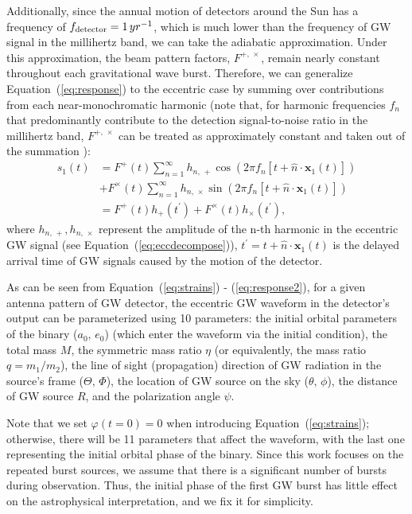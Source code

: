 \documentclass[%
 reprint,
 amsmath,amssymb,
 aps,
]{revtex4-2}
\begin{document}
Additionally, since the annual motion of detectors around the Sun has a frequency of $f_{\rm detector}=1\, yr^{-1}$, which is much lower than the frequency of GW signal in the millihertz band, we can take the adiabatic approximation. Under this approximation, the beam pattern factors, $F^{+,\, \times}$, remain nearly constant throughout each gravitational wave burst. Therefore, we can generalize Equation~(\ref{eq:response}) to the eccentric case by summing over contributions from each near-monochromatic harmonic (note that, for harmonic frequencies $f_n$ that predominantly contribute to the detection signal-to-noise ratio in the millihertz band, $F^{+,\, \times}$ can be treated as approximately constant and taken out of the summation \citep[see e.g.,][]{O'Leary+09,Wang+21,Xuan+23b}):
\begin{equation}
\begin{aligned}
s_1(t) & =F^{+}(t) \sum_{n=1}^{\infty}h_{n,\,+} \cos \left(2 \pi f_n\left[t+\hat{n} \cdot \mathbf{x}_1(t)\right]\right) \\
& +F^{\times}(t) \sum_{n=1}^{\infty}h_{n,\,\times} \sin \left(2 \pi f_n\left[t+\hat{n} \cdot \mathbf{x}_1(t)\right]\right) \\
& = F^{+}(t) h_{+}(t^{\prime}) +F^{\times}(t) h_{\times}(t^{\prime}) ,\label{eq:response2}
\end{aligned}
\end{equation}
where $h_{n,\,+}, h_{n,\,\times}$ represent the amplitude of the n-th harmonic in the eccentric GW signal (see Equation~(\ref{eq:eccdecompose})), $t^{\prime}=t+\hat{n} \cdot \mathbf{x}_1(t)$ is the delayed arrival time of GW signals caused by the motion of the detector.

As can be seen from Equation~(\ref{eq:strains}) - (\ref{eq:response2}), for a given antenna pattern of GW detector, the eccentric GW waveform in the detector's output can be parameterized using 10 parameters: the initial orbital parameters of the binary ($a_0,\,e_0$) (which enter the waveform via the initial condition), the total mass $M$, the symmetric mass ratio $\eta$ (or equivalently, the mass ratio $q=m_1/m_2$), the line of sight (propagation) direction of GW radiation in the source's frame ($\Theta,\, \Phi$), the location of GW source on the sky ($\theta,\, \phi$), the distance of GW source $R$, and the polarization angle $\psi$. 

Note that we set $\varphi(t=0)=0$ when introducing Equation~(\ref{eq:strains}); otherwise, there will be 11 parameters that affect the waveform, with the last one representing the initial orbital phase of the binary. Since this work focuses on the repeated burst sources, we assume that there is a significant number of bursts during observation. Thus, the initial phase of the first GW burst has little effect on the astrophysical interpretation, and we fix it for simplicity.
\end{document}
